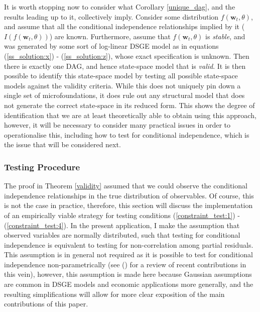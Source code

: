 \documentclass{article}
\begin{document}
It is worth stopping now to consider what Corollary \ref{unique_dag}, and the results leading up to it, collectively imply. Consider some distribution $f(\mathbf{w}_t,\theta)$, and assume that all the conditional independence relationships implied by it ($I(f(\mathbf{w}_t,\theta))$) are known. Furthermore, assume that $f(\mathbf{w}_t,\theta)$ is \textit{stable}, and was generated by some sort of log-linear DSGE model as in equations (\ref{ss_solution:x}) - (\ref{ss_solution:z}), whose exact specification is unknown. Then there is exactly one DAG, and hence state-space model that is \textit{valid}. It is then possible to identify this state-space model by testing all possible state-space models against the validity criteria. While this does not uniquely pin down a single set of microfoundations, it does rule out any structural model that does not generate the correct state-space in its reduced form. This shows the degree of identification that we are at least theoretically able to obtain using this approach, however, it will be necessary to consider many practical issues in order to operationalise this, including how to test for conditional independence, which is the issue that will be considered next.

\subsubsection{Testing Procedure} \label{testing}

The proof in Theorem \ref{validity} assumed that we could observe the conditional independence relationships in the true distribution of observables. Of course, this is not the case in practice, therefore, this section will discuss the implementation of an empirically viable strategy for testing conditions (\ref{constraint_test:1}) - (\ref{constraint_test:4}). In the present application, I make the assumption that observed variables are normally distributed, such that testing for conditional independence is equivalent to testing for non-correlation among partial residuals. This assumption is in general not required as it is possible to test for conditional independence non-parametrically (see \citeauthor{strobl2019approximate} (\citeyear{strobl2019approximate}) for a review of recent contributions in this vein), however, this assumption is made here because Gaussian assumptions are common in DSGE models and economic applications more generally, and the resulting simplifications will allow for more clear exposition of the main contributions of this paper. 
\end{document}
